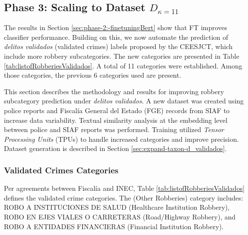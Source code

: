 \documentclass[onecolumn, journal, english, 12pt, a4paper]{IEEEtran} %
\newcommand{\printInicialesComision}{CEESJCT}
\theoremstyle{definition}
\begin{document}
  
\subsection{Phase 3: Scaling to Dataset $D_{\kappa=11}$}
\label{sec:phase-3:-scaling-fullmodel}

The results in Section \ref{sec:phase-2:-finetuningBert} show that FT
improves classifier performance. Building on this, we now automate the
prediction of \emph{delitos validados} (validated crimes) labels
proposed by the \printInicialesComision, which include more robbery
subcategories. The new categories are presented in Table
\ref{tab:listofRobberiesValidados}. A total of 11 categories were
established. Among those categories, the previous 6 categories used
are present. %

This section describes the methodology and results for improving
robbery subcategory prediction under \emph{delitos validados}. A new
dataset was created using police reports and Fiscalía General del
Estado (FGE) records from SIAF to increase data variability. Textual
similarity analysis at the embedding level between police and SIAF
reports was performed. Training utilized \emph{Tensor Processing
  Units} (TPUs) to handle increased categories and improve
precision. Dataset generation is described in Section
\ref{sec:expand-taxon-d_validados}.

\subsubsection{Validated Crimes Categories}

Per agreements between Fiscalía and INEC, Table
\ref{tab:listofRobberiesValidados} defines the validated crime
categories. The  (Other Robberies) category includes:
ROBO A INSTITUCIONES DE SALUD (Healthcare Institution Robbery), ROBO
EN EJES VIALES O CARRETERAS (Road/Highway Robbery), and ROBO A
ENTIDADES FINANCIERAS (Financial Institution Robbery).
\end{document}
